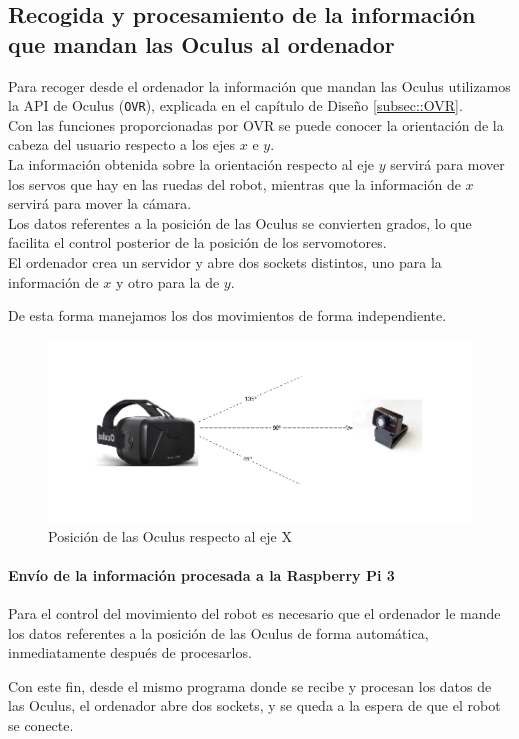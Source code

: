 \documentclass[twoside, 11pt]{epstfg}
\begin{document}
\subsection{Recogida y procesamiento de la información que mandan las Oculus al ordenador}

Para recoger desde el ordenador la información que mandan las Oculus utilizamos la API de Oculus (\texttt{OVR}), explicada en el capítulo de Diseño \ref{subsec::OVR}.\\
Con las funciones proporcionadas por OVR se puede conocer la orientación de la cabeza del usuario respecto a los ejes $x$ e $y$.\\
La información obtenida sobre la orientación respecto al eje $y$ servirá para mover los servos que hay en las ruedas del robot, mientras que la información de $x$ servirá para mover la cámara.\\
Los datos referentes a la posición de las Oculus se convierten grados, lo que facilita el control posterior de la posición de los servomotores.\\
El ordenador crea un servidor y abre dos sockets distintos, uno para la información de $x$ y otro para la de $y$.


De esta forma manejamos los dos movimientos de forma independiente.


\begin{figure}[h!]
	\centerline{
		\mbox{\includegraphics[width=.80\textwidth]{images/Oculusgrados2.png}}
	}
	\caption{Posición de las Oculus respecto al eje X}
\end{figure}
\newpage
\paragraph{Envío de la información procesada a la Raspberry Pi 3}


Para el control del movimiento del robot es necesario que el ordenador le mande los datos referentes a la posición de las Oculus de forma automática, inmediatamente después de procesarlos.

Con este fin, desde el mismo programa donde se recibe y procesan los datos de las Oculus, el ordenador abre dos sockets, y se queda a la espera de que el robot se conecte.
\end{document}
